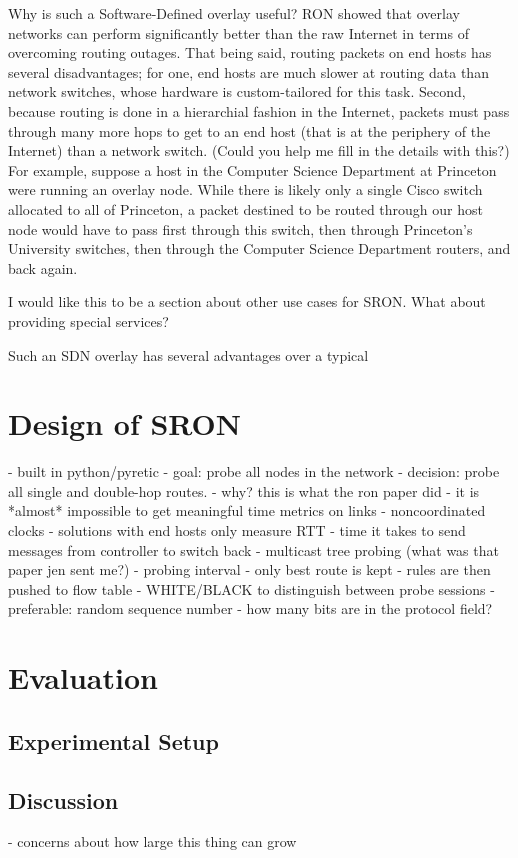 \documentclass[pageno]{jpaper}
\begin{document}
Why is such a Software-Defined overlay useful? RON\cite{ron} showed that overlay networks can 
perform significantly better than the raw Internet in terms of overcoming routing outages. That 
being said, routing packets on end hosts has several disadvantages; for one, end hosts are 
much slower at routing data than network switches, whose hardware is custom-tailored for this task.
Second, because routing is done in a hierarchial fashion in the Internet, packets must pass 
through many more hops to get to an end host (that is at the periphery of the Internet) than a 
network switch. (Could you help me fill in the details with this?) 
For example, suppose a host in the Computer Science Department at Princeton 
were running an overlay node. While there is likely only a single Cisco switch allocated to all of 
Princeton, a packet destined to be routed through our host node would have to pass first through this 
switch, then through Princeton's University switches, then through the Computer Science Department
routers, and back again.

I would like this to be a section about other use cases for SRON. What about providing special services? 
 
 
Such an SDN overlay 
has several advantages over a typical 

\section{Design of SRON}
- built in python/pyretic
- goal: probe all nodes in the network
- decision: probe all single and double-hop routes.
	- why? this is what the ron paper did
	- it is *almost* impossible to get meaningful time metrics on links
		- noncoordinated clocks
		- solutions with end hosts only measure RTT
		- time it takes to send messages from controller to switch back
- multicast tree probing (what was that paper jen sent me?)
- probing interval
- only best route is kept
- rules are then pushed to flow table
- WHITE/BLACK to distinguish between probe sessions
	- preferable: random sequence number
	- how many bits are in the protocol field?

\section{Evaluation}
\subsection{Experimental Setup}
\subsection{Discussion}
	- concerns about how large this thing can grow
\end{document}
